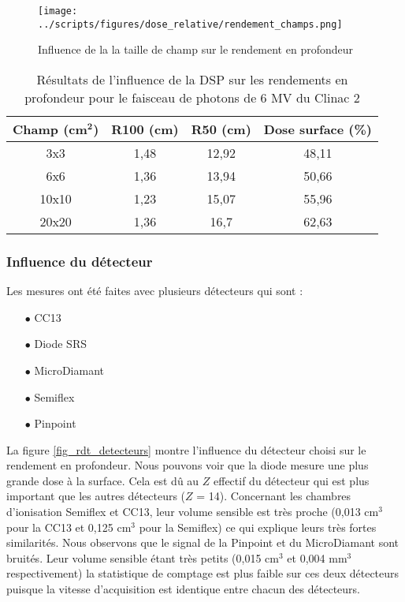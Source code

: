 \documentclass{article}
\begin{document}
\begin{figure}[h!]
  \centering
  \texttt{[image: ../scripts/figures/dose\_relative/rendement\_champs.png]}
  \caption{Influence de la la taille de champ sur le rendement en profondeur}
  \label{fig_rdt_champ}
\end{figure}

\begin{table}[h]
  \centering
  \begin{tabular}{cccc}
    \toprule
    \textbf{Champ (cm}$\mathbf{^2}$\textbf{)} & \textbf{R100 (cm)} & \textbf{R50 (cm)} & \textbf{Dose surface (\%)} \\
    \toprule
    3x3 & 1,48 & 12,92 & 48,11 \\
    6x6 & 1,36 & 13,94 &  50,66 \\
    10x10 & 1,23 & 15,07 & 55,96 \\
    20x20 & 1,36 & 16,7 & 62,63 \\
    \bottomrule
  \end{tabular}
  \caption{Résultats de l'influence de la DSP sur les rendements en profondeur pour le faisceau de photons de 6 MV du Clinac 2}
  \label{table_rdt_dsp}
\end{table}

\newpage
\subsubsection{Influence du détecteur}

Les mesures ont été faites avec plusieurs détecteurs qui sont :

\begin{itemize}
  \item[$\bullet$] CC13
  \item[$\bullet$] Diode SRS
  \item[$\bullet$] MicroDiamant
  \item[$\bullet$] Semiflex
  \item[$\bullet$] Pinpoint
\end{itemize}

La figure \ref*{fig_rdt_detecteurs} montre l'influence du détecteur choisi sur le rendement en profondeur. Nous pouvons voir que la diode mesure une plus grande dose à la surface. Cela est dû au $Z$ effectif du détecteur qui est plus important que les autres détecteurs ($Z$ = 14). Concernant les chambres d'ionisation Semiflex et CC13, leur volume sensible est très proche (0,013 cm$^3$ pour la CC13 et 0,125 cm$^3$ pour la Semiflex) ce qui explique leurs très fortes similarités. Nous observons que le signal de la Pinpoint et du MicroDiamant sont bruités. Leur volume sensible étant très petits (0,015 cm$^3$ et 0,004 mm$^3$ respectivement) la statistique de comptage est plus faible sur ces deux détecteurs puisque la vitesse d'acquisition est identique entre chacun des détecteurs.
\end{document}
